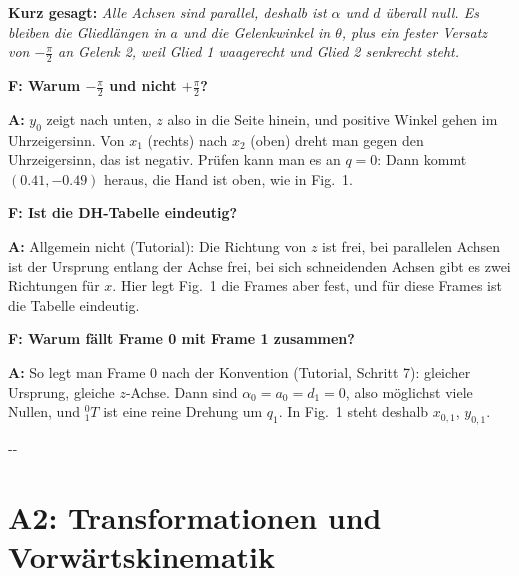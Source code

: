 \documentclass[10pt,a4paper]{article}
\makeatletter
\newcommand{\secneed}[1]{\par\penalty\@M\begingroup\setlength{\dimen@}{#1}\dimen@ii\pagegoal
  \advance\dimen@ii-\pagetotal\ifdim\dimen@>\dimen@ii\ifdim\dimen@ii>\z@\vfil\fi\penalty-\@M\fi\endgroup}
\let\oldsection\section
\renewcommand{\section}{\secneed{9\baselineskip}\oldsection}
\newcommand{\frage}[2]{\textbf{F: #1}\par\nopagebreak\vspace{1pt}\textbf{A:} #2\par\vspace{5pt}}
\newcommand{\sagen}[1]{\textbf{Kurz gesagt:} \emph{#1}\par}
\makeatother
\begin{document}
\sagen{Alle Achsen sind parallel, deshalb ist $\alpha$ und $d$ überall null. Es bleiben die Gliedlängen in $a$ und die
Gelenkwinkel in $\theta$, plus ein fester Versatz von $-\frac{\pi}{2}$ an Gelenk 2, weil Glied 1 waagerecht und Glied 2
senkrecht steht.}

\begin{fragen}
\frage{Warum $-\frac{\pi}{2}$ und nicht $+\frac{\pi}{2}$?}
{$y_0$ zeigt nach unten, $z$ also in die Seite hinein, und positive Winkel gehen im Uhrzeigersinn. Von $x_1$ (rechts)
nach $x_2$ (oben) dreht man gegen den Uhrzeigersinn, das ist negativ. Prüfen kann man es an $q = 0$: Dann kommt
$(0.41, -0.49)$ heraus, die Hand ist oben, wie in Fig.~1.}
\frage{Ist die DH-Tabelle eindeutig?}
{Allgemein nicht (Tutorial): Die Richtung von $z$ ist frei, bei parallelen Achsen ist der Ursprung entlang der Achse
frei, bei sich schneidenden Achsen gibt es zwei Richtungen für $x$. Hier legt Fig.~1 die Frames aber fest, und für diese
Frames ist die Tabelle eindeutig.}
\frage{Warum fällt Frame 0 mit Frame 1 zusammen?}
{So legt man Frame 0 nach der Konvention (Tutorial, Schritt 7): gleicher Ursprung, gleiche $z$-Achse. Dann sind
$\alpha_0 = a_0 = d_1 = 0$, also möglichst viele Nullen, und ${}^0_1T$ ist eine reine Drehung um $q_1$. In Fig.~1 steht
deshalb $x_{0,1}$, $y_{0,1}$.}
\end{fragen}

\section{A2: Transformationen und Vorwärtskinematik}
\end{document}
